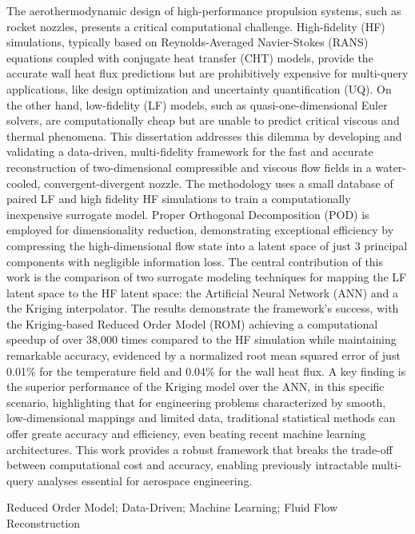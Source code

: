 \documentclass[tg, EN]{ufabcFHZh_tg}
\begin{document}
\begin{foreignabstract}
The aerothermodynamic design of high-performance propulsion systems, such as rocket nozzles, presents a critical computational challenge. High-fidelity (HF) simulations, typically based on Reynolds-Averaged Navier-Stokes (RANS) equations coupled with conjugate heat transfer (CHT) models, provide the accurate wall heat flux predictions but are prohibitively expensive for multi-query applications, like design optimization and uncertainty quantification (UQ). On the other hand, low-fidelity (LF) models, such as quasi-one-dimensional Euler solvers, are computationally cheap but are unable to predict critical viscous and thermal phenomena. This dissertation addresses this dilemma by developing and validating a data-driven, multi-fidelity framework for the fast and accurate reconstruction of two-dimensional compressible and viscous flow fields in a water-cooled, convergent-divergent nozzle. The methodology uses a small database of paired LF and high fidelity HF simulations to train a computationally inexpensive surrogate model. Proper Orthogonal Decomposition (POD) is employed for dimensionality reduction, demonstrating exceptional efficiency by compressing the high-dimensional flow state into a latent space of just 3 principal components with negligible information loss. The central contribution of this work is the comparison of two surrogate modeling techniques for mapping the LF latent space to the HF latent space: the Artificial Neural Network (ANN) and a the Kriging interpolator. The results demonstrate the framework's success, with the Kriging-based Reduced Order Model (ROM) achieving a computational speedup of over 38,000 times compared to the HF simulation while maintaining remarkable accuracy, evidenced by a normalized root mean squared error of just 0.01\% for the temperature field and 0.04\% for the wall heat flux. A key finding is the superior performance of the Kriging model over the ANN, in this specific scenario, highlighting that for engineering problems characterized by smooth, low-dimensional mappings and limited data, traditional statistical methods can offer greate accuracy and efficiency, even beating recent machine learning architectures. This work provides a robust framework that breaks the trade-off between computational cost and accuracy, enabling previously intractable multi-query analyses essential for aerospace engineering.
\end{foreignabstract}
\keywordeng
{Reduced Order Model};
{Data-Driven};
{Machine Learning};
{Fluid Flow Reconstruction}
\end{document}
